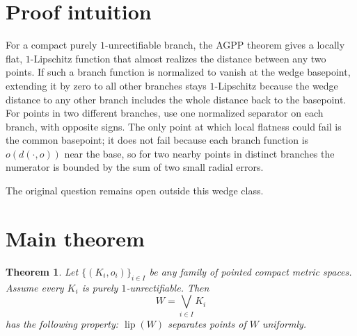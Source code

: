 \documentclass[11pt]{amsart}
\newtheorem{theorem}{Theorem}
\newcommand{\lip}{\operatorname{lip}}
\begin{document}
\section*{Proof intuition}

For a compact purely $1$-unrectifiable branch, the AGPP theorem
\cite{AGPP} gives a locally flat, $1$-Lipschitz function that almost realizes
the distance between any two points.  If such a branch function is normalized
to vanish at the wedge basepoint, extending it by zero to all other branches
stays $1$-Lipschitz because the wedge distance to any other branch includes
the whole distance back to the basepoint.  For points in two different
branches, use one normalized separator on each branch, with opposite signs.
The only point at which local flatness could fail is the common basepoint; it
does not fail because each branch function is $o(d(\cdot,o))$ near the base,
so for two nearby points in distinct branches the numerator is bounded by the
sum of two small radial errors.

The original question remains open outside this wedge class.

\section*{Main theorem}

\begin{theorem}
\label{thm:wedge-spu}
Let $\{(K_i,o_i)\}_{i\in I}$ be any family of pointed compact metric spaces.
Assume every $K_i$ is purely $1$-unrectifiable.  Then
\[
  W=\bigvee_{i\in I} K_i
\]
has the following property: $\lip(W)$ separates points of $W$ uniformly.
\end{theorem}
\end{document}

